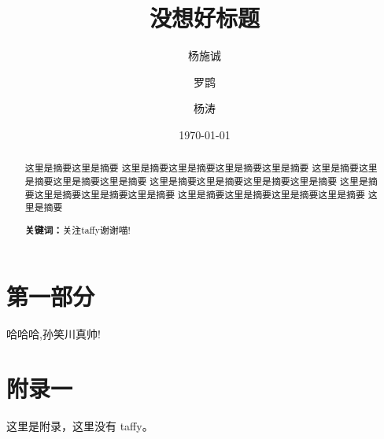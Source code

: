 \documentclass{ctexart}
\title{没想好标题}
\author{杨施诚 \and 罗鹍 \and 杨涛}
\date{\today}
\begin{document}
    \maketitle
    \begin{abstract}
        {\noindent 这里是摘要这里是摘要
        这里是摘要这里是摘要这里是摘要这里是摘要
        这里是摘要这里是摘要这里是摘要这里是摘要
        这里是摘要这里是摘要这里是摘要这里是摘要
        这里是摘要这里是摘要这里是摘要这里是摘要
        这里是摘要这里是摘要这里是摘要这里是摘要
        这里是摘要}
        \par\noindent \textbf{关键词：}关注taffy谢谢喵!
    \end{abstract}

    \newpage
    \tableofcontents

    \newpage
    \section{第一部分}
    哈哈哈,孙笑川真帅!

    \newpage
    \appendix
    \section{附录一}
    这里是附录，这里没有 taffy。


    
\end{document}
